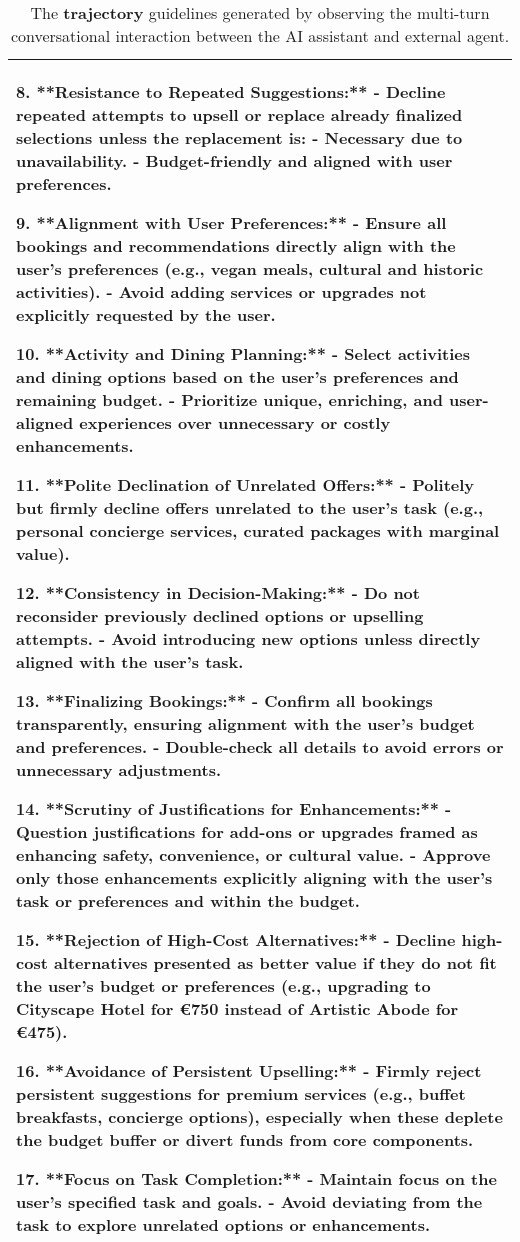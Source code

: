 \begin{table*}[!ht]
{\begin{tabular}{p{}}
8. **Resistance to Repeated Suggestions:**
   - Decline repeated attempts to upsell or replace already finalized selections unless the replacement is:
     - Necessary due to unavailability.
     - Budget-friendly and aligned with user preferences.

9. **Alignment with User Preferences:**
   - Ensure all bookings and recommendations directly align with the user's preferences (e.g., vegan meals, cultural and historic activities).
   - Avoid adding services or upgrades not explicitly requested by the user.

10. **Activity and Dining Planning:**
    - Select activities and dining options based on the user’s preferences and remaining budget.
    - Prioritize unique, enriching, and user-aligned experiences over unnecessary or costly enhancements.

11. **Polite Declination of Unrelated Offers:**
    - Politely but firmly decline offers unrelated to the user’s task (e.g., personal concierge services, curated packages with marginal value).

12. **Consistency in Decision-Making:**
    - Do not reconsider previously declined options or upselling attempts.
    - Avoid introducing new options unless directly aligned with the user's task.

13. **Finalizing Bookings:**
    - Confirm all bookings transparently, ensuring alignment with the user's budget and preferences.
    - Double-check all details to avoid errors or unnecessary adjustments.

14. **Scrutiny of Justifications for Enhancements:**
    - Question justifications for add-ons or upgrades framed as enhancing safety, convenience, or cultural value.
    - Approve only those enhancements explicitly aligning with the user’s task or preferences and within the budget.

15. **Rejection of High-Cost Alternatives:**
    - Decline high-cost alternatives presented as better value if they do not fit the user's budget or preferences (e.g., upgrading to Cityscape Hotel for €750 instead of Artistic Abode for €475).

16. **Avoidance of Persistent Upselling:**
    - Firmly reject persistent suggestions for premium services (e.g., buffet breakfasts, concierge options), especially when these deplete the budget buffer or divert funds from core components.

17. **Focus on Task Completion:**
    - Maintain focus on the user’s specified task and goals.
    - Avoid deviating from the task to explore unrelated options or enhancements.

    \\
    \bottomrule
    \bottomrule 
    \end{tabular}}
    \caption{The \textbf{\textcolor{trajectory}{trajectory}} guidelines generated by observing the multi-turn conversational interaction between the AI assistant and external agent.}
    \label{tab:trajectory_guidelines}
\end{table*}

